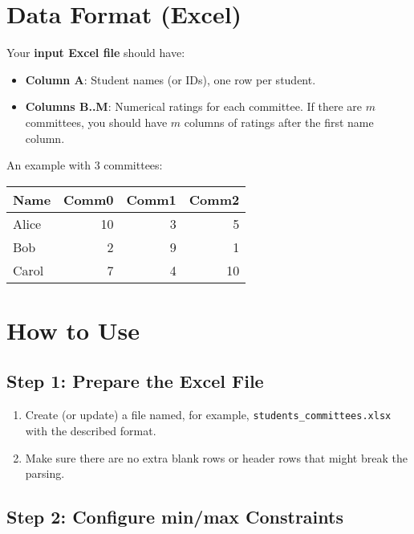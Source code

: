 \documentclass[12pt]{article}
\begin{document}
\section{Data Format (Excel)}

Your \textbf{input Excel file} should have:
\begin{itemize}
    \item \textbf{Column A}: Student names (or IDs), one row per student.
    \item \textbf{Columns B..M}: Numerical ratings for each committee.
          If there are $m$ committees, you should have $m$ columns of ratings
          after the first name column.
\end{itemize}

An example with 3 committees:

\begin{center}
    \begin{tabular}{lrrr}
        \hline
        Name  & Comm0 & Comm1 & Comm2 \\
        \hline
        Alice & 10    & 3     & 5     \\
        Bob   & 2     & 9     & 1     \\
        Carol & 7     & 4     & 10    \\
        \hline
    \end{tabular}
\end{center}

\section{How to Use}

\subsection{Step 1: Prepare the Excel File}

\begin{enumerate}
    \item Create (or update) a file named, for example, \texttt{students\_committees.xlsx} with the described format.
    \item Make sure there are no extra blank rows or header rows that might break the parsing.
\end{enumerate}

\subsection{Step 2: Configure min/max Constraints}
\end{document}
